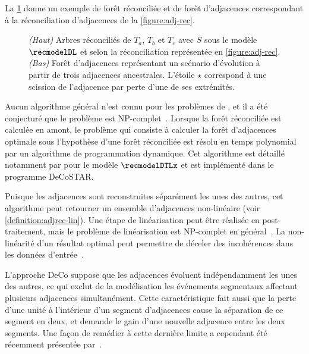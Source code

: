 La \cref{figure:adj-forest} donne un exemple de forêt réconciliée et de forêt d’adjacences correspondant à la réconciliation d’adjacences de la \cref{figure:adj-rec}.

\begin{figure}[htb]
    \capstart
    \centering
    
    \caption{
        \emph{(Haut)}
        Arbres réconciliés de \(T_a\), \(T_b\) et \(T_c\) avec \(S\)
        sous le modèle \(\recmodelDL\)
        et selon la réconciliation représentée en \cref{figure:adj-rec}.
        \emph{(Bas)}
        Forêt d’adjacences représentant un scénario d’évolution à partir de trois adjacences ancestrales.
        L’étoile \(\star\) correspond à une scission de l’adjacence par perte d’une de ses extrémités.
    }
    \label{figure:adj-forest}
\end{figure}

Aucun algorithme général n’est connu pour les problèmes de , et il a été conjecturé que le problème est NP-complet~\parencite{Boussau2020ReconcilingGeneTrees}.
Lorsque la forêt réconciliée est calculée en amont, le problème qui consiste à calculer la forêt d’adjacences optimale sous l’hypothèse d’une forêt réconciliée est résolu en temps polynomial par un algorithme de programmation dynamique.
Cet algorithme est détaillé notamment par \textcite{Duchemin2017DecostarReconstructingAncestral} pour le modèle \(\recmodelDTLx\) et est implémenté dans le programme DeCoSTAR.

Puisque les adjacences sont reconstruites séparément les unes des autres, cet algorithme peut retourner un ensemble d’adjacences non-linéaire (voir \cref{definition:adjrec-lin}).
Une étape de linéarisation peut être réalisée en post-traitement, mais le problème de linéarisation est NP-complet en général~\parencite{Manuch2012LinearizationAncestralMultichromosomal}.
La non-linéarité d’un résultat optimal peut permettre de déceler des incohérences dans les données d’entrée~\parencite{Tannier2020AncestralGenomeOrganization}.

L’approche DeCo suppose que les adjacences évoluent indépendamment les unes des autres, ce qui exclut de la modélisation les événements segmentaux affectant plusieurs adjacences simultanément.
Cette caractéristique fait aussi que la perte d’une unité à l’intérieur d’un segment d’adjacences cause la séparation de ce segment en deux, et demande le gain d’une nouvelle adjacence entre les deux segments.
Une façon de remédier à cette dernière limite a cependant été récemment présentée par~\textcite{Tannier2020AncestralGenomeOrganization}.

